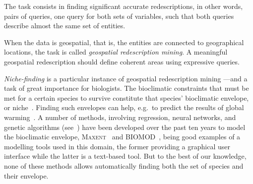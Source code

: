The task consists in finding significant accurate redescriptions, in other words, pairs of
queries, one query for both sets of variables, such that both queries
describe almost the same set of entities.

When the data is geospatial, that is, the entities are connected to
geographical locations, the task is called \emph{geospatial redescription mining}.
 A meaningful geospatial redescription should define
coherent areas using expressive queries.

\emph{Niche-finding} is a particular instance of geospatial redescription
mining ---and a task of great importance for biologists.  The
bioclimatic constraints that must be met for a certain species to
survive constitute that species' bioclimatic envelope, or
niche~\cite{grinnell17niche}.  Finding such envelopes can help, e.g.\
to predict the results of global warming~\cite{pearson03predicting}.
A number of methods, involving regression, neural networks, and
genetic algorithms (see~\cite{soberon05interpretation}) have been
developed over the past ten years to model the bioclimatic envelope,
\textsc{Maxent}~\cite{phillips2006maximum} and \textsc{BIOMOD}~\cite{thuiller09biomod}, being good examples of a
modelling tools used in this domain, the former providing a graphical user interface while the latter is a text-based tool.  But to the best of our knowledge,
none of these methods allows automatically finding both the set of
species and their envelope.

